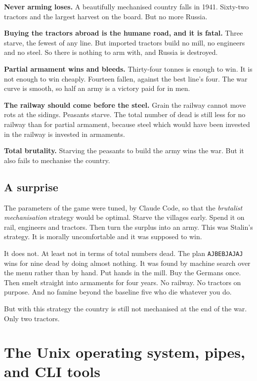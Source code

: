 \documentclass[11pt,a4paper]{article}
\begin{document}
\vspace{5mm}

\textbf{Never arming loses.} A beautifully mechanised country falls in 1941. Sixty-two tractors and
the largest harvest on the board. But no more Russia.

\textbf{Buying the tractors abroad is the humane road, and it is fatal.} Three starve, the fewest
of any line. But imported tractors build no mill, no engineers and no steel. So there is nothing to
arm with, and Russia is destroyed.

\textbf{Partial armament wins and bleeds.} Thirty-four tonnes is enough to win. It is not enough to
win cheaply. Fourteen fallen, against the best line's four. The war curve is smooth, so half an
army is a victory paid for in men.

\textbf{The railway should come before the steel.} Grain the railway cannot move rots at the sidings.
Peasants starve. The total number of dead is still less for no railway than for partial armament,
because steel which would have been invested in the railway is invested in armaments.

\textbf{Total brutality.} Starving the peasants to build the army wins the war. But it also fails
to mechanise the country.

\subsection{A surprise}

The parameters of the game were tuned, by Claude Code, so that the \emph{brutalist mechanisation}
strategy would be optimal. Starve the villages
early. Spend it on rail, engineers and tractors. Then turn the surplus into an army. This was
Stalin's strategy. It is morally uncomfortable and it was supposed to win.

It does not. At least not in terms of total numbers dead. The plan \texttt{AJBEBJAJAJ} wins for
nine dead by doing almost nothing. It was found by
machine search over the menu rather than by hand. Put hands in the mill. Buy the Germans once. Then
smelt straight into armaments for four years. No railway. No tractors on purpose. And no famine
beyond the baseline five who die whatever you do.

But with this strategy the country is still not mechanised at the end of the war. Only two
tractors.


\newpage

\section{The Unix operating system, pipes, and CLI tools}
\label{sec:unix}
\end{document}
